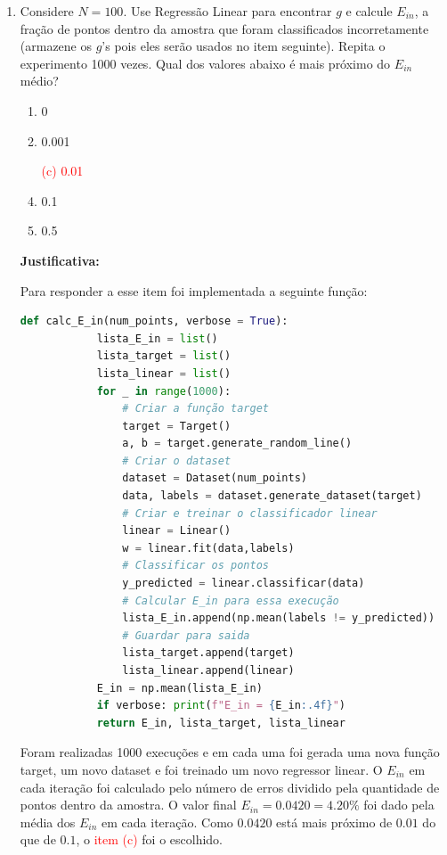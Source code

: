 \begin{enumerate}
    \item Considere $N = 100$. Use Regressão Linear para encontrar $g$ e calcule $E_{in}$, a fração de pontos dentro da amostra que foram classificados incorretamente (armazene os $g$'s pois eles serão usados no item seguinte). Repita o experimento 1000 vezes. Qual dos valores abaixo é mais próximo do $E_{in}$ médio?
    
    \begin{enumerate}
        \item 0
        \item 0.001
        \item[\textcolor{red}{(c)}]\textcolor{red}{0.01}\addtocounter{enumii}{1}
        \item 0.1
        \item 0.5
    \end{enumerate}
 
    \par

    \textbf{Justificativa:}

    Para responder a esse item foi implementada a seguinte função:

    \begin{lstlisting}[language=Python, caption=Cálculo do E\_in, label=cod:calc_E_in]
        def calc_E_in(num_points, verbose = True):
            lista_E_in = list()
            lista_target = list()
            lista_linear = list()
            for _ in range(1000):
                # Criar a função target
                target = Target()
                a, b = target.generate_random_line()
                # Criar o dataset
                dataset = Dataset(num_points)
                data, labels = dataset.generate_dataset(target)
                # Criar e treinar o classificador linear
                linear = Linear()
                w = linear.fit(data,labels)
                # Classificar os pontos
                y_predicted = linear.classificar(data)
                # Calcular E_in para essa execução
                lista_E_in.append(np.mean(labels != y_predicted))
                # Guardar para saida
                lista_target.append(target)
                lista_linear.append(linear)
            E_in = np.mean(lista_E_in)
            if verbose: print(f"E_in = {E_in:.4f}")
            return E_in, lista_target, lista_linear
    \end{lstlisting}

    Foram realizadas 1000 execuções e em cada uma foi gerada uma nova função target, um novo dataset e foi treinado um novo regressor linear. O $E_{in}$ em cada iteração foi calculado pelo número de erros dividido pela quantidade de pontos dentro da amostra. O valor final $E_{in} = 0.0420 = 4.20\%$ foi dado pela média dos $E_{in}$ em cada iteração. Como $0.0420$ está mais próximo de $0.01$ do que de $0.1$, o \textcolor{red}{item (c)} foi o escolhido.


\end{enumerate}
